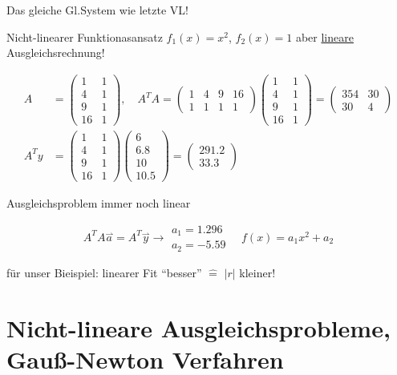 \documentclass[a4paper,ngerman]{scrbook}
\newcommand{\rharp}[1]{\ensuremath{\overset{\rightharpoonup}{#1}}}%
\begin{document}
Das gleiche Gl.System wie letzte VL!

Nicht-linearer Funktionasansatz $f_1(x) = x^2$, $f_2(x) = 1$ aber \underline{lineare} Ausgleichsrechnung!

\begin{align*}
  A &=
  \begin{pmatrix}
    1 & 1\\ 4 & 1\\ 9 & 1\\ 16 & 1
  \end{pmatrix}, \quad
    A^TA =
    \begin{pmatrix}
      1 & 4 & 9 & 16\\
      1 & 1 & 1 & 1
    \end{pmatrix}
    \begin{pmatrix}
      1 & 1\\ 4 & 1\\ 9 & 1\\ 16 & 1
    \end{pmatrix} =
    \begin{pmatrix}
      354 & 30\\
      30 & 4
    \end{pmatrix}\\
A^Ty &=   \begin{pmatrix}
    1 & 1\\ 4 & 1\\ 9 & 1\\ 16 & 1
  \end{pmatrix}
  \begin{pmatrix}
    6\\ 6.8\\ 10\\ 10.5
  \end{pmatrix} =
  \begin{pmatrix}
    291.2\\ 33.3
  \end{pmatrix}
\end{align*}

Ausgleichsproblem immer noch linear

\[
A^TA\rharp{a} = A^T \rharp{y} \to
\begin{array}{c}
  a_1 = 1.296\\
  a_2 = -5.59
\end{array}
\quad f(x) = a_1x^2 + a_2
\]

für unser Bieispiel: linearer Fit "`besser"' $\hat{=}$ $|r|$ kleiner!

\section{Nicht-lineare Ausgleichsprobleme, Gauß-Newton Verfahren}
\end{document}
